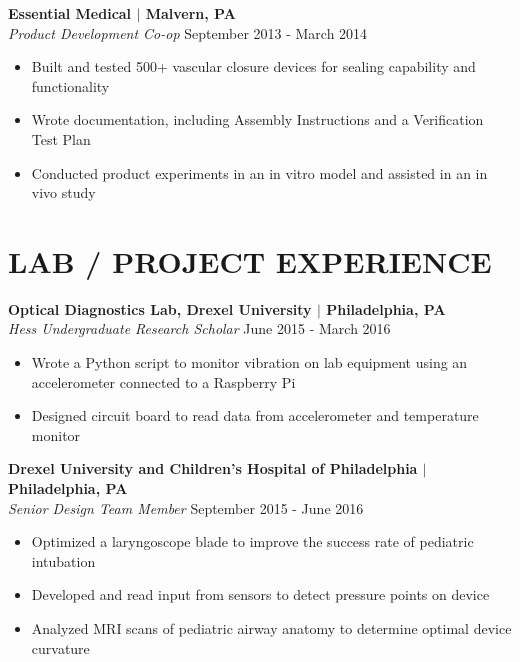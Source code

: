 \documentclass[line,resmargin,11pt]{res}
\begin{document}
\begin{resume}
\textbf{Essential Medical $|$ Malvern, PA} \\
{\sl Product Development Co-op} \hfill September 2013 - March 2014
	\begin{itemize} \itemsep -2pt
		\item  Built and tested 500+ vascular closure devices for sealing capability and functionality
		\item  Wrote documentation, including Assembly Instructions and a Verification Test Plan
		\item  Conducted product experiments in an in vitro model and assisted in an in vivo study
	\end{itemize}

\section{LAB / PROJECT EXPERIENCE}
\textbf{Optical Diagnostics Lab, Drexel University $|$ Philadelphia, PA} \\
{\sl Hess Undergraduate Research Scholar} \hfill June 2015 - March 2016
	\begin{itemize}  \itemsep -2pt %
		\item  Wrote a Python script to monitor vibration on lab equipment using an accelerometer connected to a Raspberry Pi
		\item  Designed circuit board to read data from accelerometer and temperature monitor
	\end{itemize}

\textbf{Drexel University and Children's Hospital of Philadelphia $|$ Philadelphia, PA} \\
{\sl Senior Design Team Member} \hfill September 2015 - June 2016 \\
\begin{itemize} \itemsep -2pt
	\item  Optimized a laryngoscope blade to improve the success rate of pediatric intubation
	\item  Developed and read input from sensors to detect pressure points on device
	\item  Analyzed MRI scans of pediatric airway anatomy to determine optimal device curvature
\end{itemize}

\end{resume}
\end{document}
